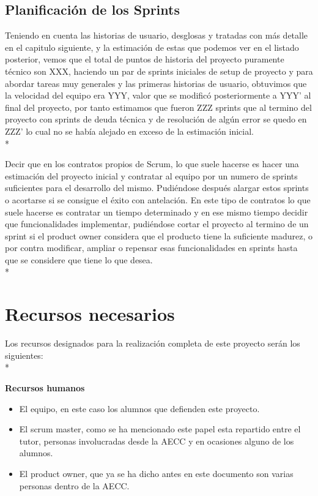 \documentclass[../pfc.tex]{subfiles}
\begin{document}
	\subsection{Planificación de los Sprints}   
	
	Teniendo en cuenta las historias de usuario, desglosas y tratadas con más detalle en el capitulo siguiente, y la estimación de estas que podemos ver en el listado posterior, vemos que el total de puntos de historia del proyecto puramente técnico son XXX, haciendo un par de sprints iniciales de setup de proyecto y para abordar tareas muy generales y las primeras historias de usuario, obtuvimos que la velocidad del equipo era YYY, valor que se modificó posteriormente a YYY' al final del proyecto, por tanto estimamos que fueron ZZZ sprints que al termino del proyecto con sprints de deuda técnica y de resolución de algún error se quedo en ZZZ' lo cual no se había alejado en exceso de la estimación inicial. \\*
	
	Decir que en los contratos propios de Scrum, lo que suele hacerse es hacer una estimación del proyecto inicial y contratar al equipo por un numero de sprints suficientes para el desarrollo del mismo. Pudiéndose después alargar estos sprints o acortarse si se consigue el éxito con antelación. En este tipo de contratos lo que suele hacerse es contratar un tiempo determinado y en ese mismo tiempo decidir que funcionalidades implementar, pudiéndose cortar el proyecto al termino de un sprint si el product owner considera que el producto tiene la suficiente madurez, o por contra modificar, ampliar o repensar esas funcionalidades en sprints hasta que se considere que tiene lo que desea. \\*
	
	
	\section{Recursos necesarios}
	Los recursos designados para la realización completa de este proyecto serán los siguientes:\\*
	
	\textbf{Recursos humanos}
	
	\begin{itemize} 
		\item El equipo, en este caso los alumnos que defienden este proyecto. 
		\item El scrum master, como se ha mencionado este papel esta repartido entre el tutor, personas involucradas desde la AECC y en ocasiones alguno de los alumnos. 
		\item El product owner, que ya se ha dicho antes en este documento son varias personas dentro de la AECC. 
	\end{itemize}
	
\end{document}
